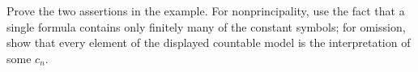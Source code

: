 \begin{exercise}
\label{ex:types-ultraproducts-03}
\label{ex:omit-constant-type}
Prove the two assertions in the example.  For nonprincipality, use the fact
that a single formula contains only finitely many of the constant symbols; for
omission, show that every element of the displayed countable model is the
interpretation of some \(c_n\).
\end{exercise}


